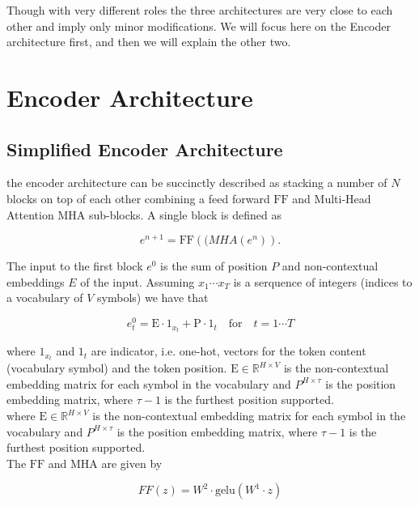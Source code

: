 Though with very different roles the three architectures are very close to each other and imply only minor modifications. We will focus here on the Encoder architecture first, and then we will explain the other two.

\section{Encoder Architecture}

\subsection{Simplified Encoder Architecture}

the encoder architecture can be succinctly described as stacking a number of $N$ blocks on top of each other combining a feed forward $\mathrm{FF}$ and Multi-Head Attention $\mathrm{MHA}$ sub-blocks. A single block is defined as

\begin{equation}
e^{n+1} = \mathrm{FF}(\mathrm(MHA(e^n)).
\end{equation}

The input to the first block $e^0$ is the sum of position $P$ and non-contextual embeddings $E$ of the input. Assuming $x_1 \cdots x_T$ is a serquence of integers (indices to a vocabulary of $V$ symbols) we have that

\begin{equation}
e^{0}_t = \mathrm{E} \cdot \mathrm{1}_{x_t} + \mathrm{P} \cdot \mathrm{1}_t \quad \mbox{for} \quad t=1 \cdots T
\end{equation}

where $\mathrm{1}_{x_t}$ and $\mathrm{1}_t$ are indicator, i.e. one-hot, vectors for the token content (vocabulary symbol) and the token position. $\mathrm{E} \in \mathbb{R}^{H \times V}$ is the non-contextual embedding matrix for each symbol in the vocabulary and $P^{H \times \tau}$ is the position embedding matrix, where  $\tau-1$ is the furthest position supported.\\
where $\mathrm{E} \in \mathbb{R}^{H \times V}$ is the non-contextual embedding matrix for each symbol in the vocabulary and $P^{H \times \tau}$ is the position embedding matrix, where  $\tau-1$ is the furthest position supported.\\

\noindent The $\mathrm{FF}$ and $\mathrm{MHA}$ are given by

\begin{equation}
FF(z) = W^2\cdot \mathrm{gelu}(W^1 \cdot z)
\end{equation}

